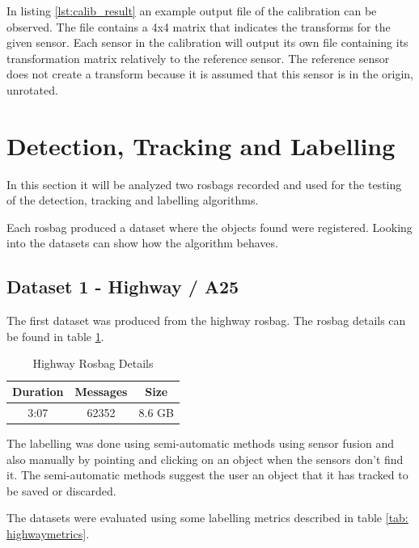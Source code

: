 In listing \ref{lst:calib_result} an example output file of the calibration can be observed. The file contains a 4x4 matrix that indicates the transforms for the given sensor. Each sensor in the calibration will output its own file containing its transformation matrix relatively to the reference sensor. The reference sensor does not create a transform because it is assumed that this sensor is in the origin, unrotated. 

\section{Detection, Tracking and Labelling}

In this section it will be analyzed two rosbags recorded and used for the testing of the detection, tracking and labelling algorithms.

Each rosbag produced a dataset where the objects found were registered. Looking into the datasets can show how the algorithm behaves.

\subsection{Dataset 1 - Highway / A25}

The first dataset was produced from the highway rosbag. The rosbag details can be found in table \ref{tab: highwayrosbag}.

\begin{table}[!h]
	\centering
	\caption{Highway Rosbag Details}
	\label{tab: highwayrosbag}
	\begin{tabular}{c|c|c}
		\textbf{Duration} & \textbf{Messages} & \textbf{Size} \\ \hline
		3:07              & 62352             & 8.6 GB        
	\end{tabular}
\end{table}

The labelling was done using semi-automatic methods using sensor fusion and also manually by pointing and clicking on an object when the sensors don't find it. The semi-automatic methods suggest the user an object that it has tracked to be saved or discarded.

The datasets were evaluated using some labelling metrics described in table \ref{tab: highwaymetrics}.

